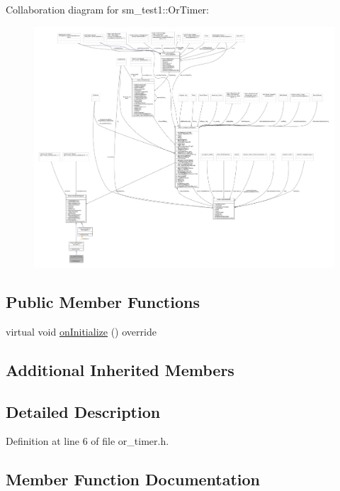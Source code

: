 Collaboration diagram for sm\+\_\+test1\+:\+:Or\+Timer\+:
\nopagebreak
\begin{figure}[H]
\begin{center}
\leavevmode
\includegraphics[width=350pt]{classsm__test1_1_1OrTimer__coll__graph}
\end{center}
\end{figure}
\subsection*{Public Member Functions}
\begin{DoxyCompactItemize}
\item 
virtual void \hyperlink{classsm__test1_1_1OrTimer_aa98ae1cc861d995cab9da3742c302e05}{on\+Initialize} () override
\end{DoxyCompactItemize}
\subsection*{Additional Inherited Members}


\subsection{Detailed Description}


Definition at line 6 of file or\+\_\+timer.\+h.



\subsection{Member Function Documentation}
\mbox{\label{classsm__test1_1_1OrTimer_aa98ae1cc861d995cab9da3742c302e05}} 
